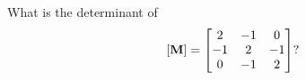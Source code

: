 \bexo
What is the determinant of 
\begin{equation}
\left[ \textbf{M} \right]=
\begin{bmatrix}
	2& -1& 0\\
-1& 2& -1\\
0& -1& 2
\end{bmatrix} ?
\end{equation}
\eexo


